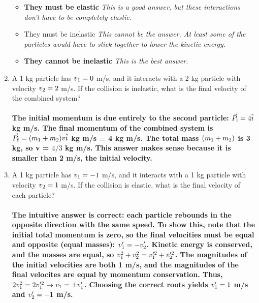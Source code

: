 \documentclass[10pt]{article}
\begin{document}
\begin{enumerate}
\begin{itemize}
\item \textbf{They must be elastic}  \textit{This is a good answer, but these interactions don't \textit{have} to be completely elastic.}
\item They must be inelastic \textit{This cannot be the answer.  At least some of the particles would have to stick together to lower the kinetic energy.}
\item \textbf{They cannot be inelastic}  \textit{This is the best answer.}
\end{itemize}
\item A 1 kg particle has $v_{\rm 1} = 0$ m/s, and it interacts with a 2 kg particle with velocity $v_{\rm 2} = 2$ m/s.  If the collision is inelastic, what is the final velocity of the combined system? \\ \\
\textbf{The initial momentum is due entirely to the second particle: $\vec{P}_{\rm i} = 4\hat{i}$ kg m/s.  The final momentum of the combined system is  $\vec{P}_{\rm f} = (m_{\rm 1} + m_{\rm 2})v\hat{i}$ kg m/s = 4 kg m/s.  The total mass $(m_{\rm 1} + m_{\rm 2})$ is 3 kg, so v = $4/3$ kg m/s.  This answer makes sense because it is smaller than 2 m/s, the initial velocity.}
\item A 1 kg particle has $v_{\rm 1} = -1$ m/s, and it interacts with a 1 kg particle with velocity $v_{\rm 2} = 1$ m/s.  If the collision is elastic, what is the final velocity of each particle? \\ \\
\textbf{The intuitive answer is correct: each particle rebounds in the opposite direction with the same speed.  To show this, note that the initial total momentum is zero, so the final velocities must be equal and opposite (equal masses): $v_{\rm 1}' = -v_{\rm 2}'$.  Kinetic energy is conserved, and the masses are equal, so $v_{\rm 1}^2 + v_{\rm 2}^2 = v_{\rm 1}'^2 + v_{\rm 2}'^2$.  The magnitudes of the initial velocities are both 1 m/s, and the magnitudes of the final velocites are equal by momentum conservation.  Thus, $2v_{\rm 1}^2 = 2v_{\rm 1}'^2 \rightarrow v_{\rm 1} = \pm v_{\rm 1}'$.  Choosing the correct roots yields $v_{\rm 1}' = 1$ m/s and $v_{\rm 2}' = -1$ m/s.}
\end{enumerate}
\end{document}
